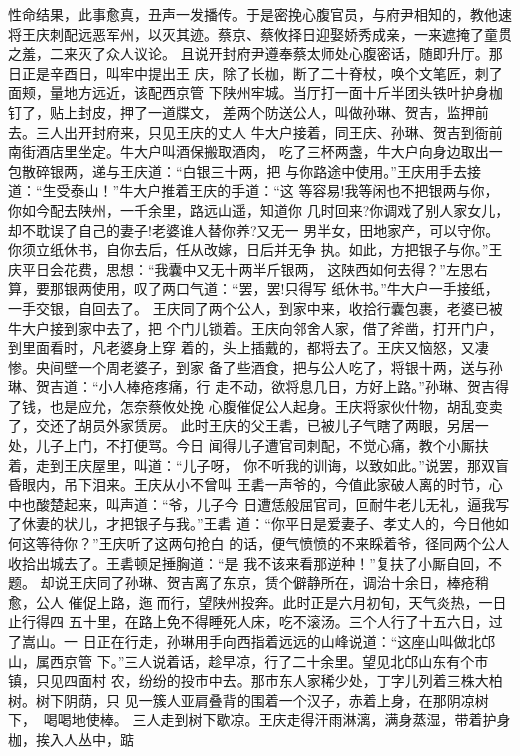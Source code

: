 性命结果，此事愈真，丑声一发播传。于是密挽心腹官员，与府尹相知的，教他速
将王庆刺配远恶军州，以灭其迹。蔡京、蔡攸择日迎娶娇秀成亲，一来遮掩了童贯
之羞，二来灭了众人议论。
且说开封府尹遵奉蔡太师处心腹密话，随即升厅。那日正是辛酉日，叫牢中提出王
庆，除了长枷，断了二十脊杖，唤个文笔匠，刺了面颊，量地方远近，该配西京管
下陕州牢城。当厅打一面十斤半团头铁叶护身枷钉了，贴上封皮，押了一道牒文，
差两个防送公人，叫做孙琳、贺吉，监押前去。三人出开封府来，只见王庆的丈人
牛大户接着，同王庆、孙琳、贺吉到衙前南街酒店里坐定。牛大户叫酒保搬取酒肉，
吃了三杯两盏，牛大户向身边取出一包散碎银两，递与王庆道：“白银三十两，把
与你路途中使用。”王庆用手去接道：“生受泰山！”牛大户推着王庆的手道：“这
等容易!我等闲也不把银两与你，你如今配去陕州，一千余里，路远山遥，知道你
几时回来?你调戏了别人家女儿，却不耽误了自己的妻子!老婆谁人替你养?又无一
男半女，田地家产，可以守你。你须立纸休书，自你去后，任从改嫁，日后并无争
执。如此，方把银子与你。”王庆平日会花费，思想：“我囊中又无十两半斤银两，
这陕西如何去得？”左思右算，要那银两使用，叹了两口气道：“罢，罢!只得写
纸休书。”牛大户一手接纸，一手交银，自回去了。
王庆同了两个公人，到家中来，收拾行囊包裹，老婆已被牛大户接到家中去了，把
个门儿锁着。王庆向邻舍人家，借了斧凿，打开门户，到里面看时，凡老婆身上穿
着的，头上插戴的，都将去了。王庆又恼怒，又凄惨。央间壁一个周老婆子，到家
备了些酒食，把与公人吃了，将银十两，送与孙琳、贺吉道：“小人棒疮疼痛，行
走不动，欲将息几日，方好上路。”孙琳、贺吉得了钱，也是应允，怎奈蔡攸处挽
心腹催促公人起身。王庆将家伙什物，胡乱变卖了，交还了胡员外家赁房。
此时王庆的父王砉，已被儿子气瞎了两眼，另居一处，儿子上门，不打便骂。今日
闻得儿子遭官司刺配，不觉心痛，教个小厮扶着，走到王庆屋里，叫道：“儿子呀，
你不听我的训诲，以致如此。”说罢，那双盲昏眼内，吊下泪来。王庆从小不曾叫
王砉一声爷的，今值此家破人离的时节，心中也酸楚起来，叫声道：“爷，儿子今
日遭恁般屈官司，叵耐牛老儿无礼，逼我写了休妻的状儿，才把银子与我。”王砉
道：“你平日是爱妻子、孝丈人的，今日他如何这等待你？”王庆听了这两句抢白
的话，便气愤愤的不来睬着爷，径同两个公人收拾出城去了。王砉顿足捶胸道：“是
我不该来看那逆种！”复扶了小厮自回，不题。
却说王庆同了孙琳、贺吉离了东京，赁个僻静所在，调治十余日，棒疮稍愈，公人
催促上路，迤而行，望陕州投奔。此时正是六月初旬，天气炎热，一日止行得四
五十里，在路上免不得睡死人床，吃不滚汤。三个人行了十五六日，过了嵩山。一
日正在行走，孙琳用手向西指着远远的山峰说道：“这座山叫做北邙山，属西京管
下。”三人说着话，趁早凉，行了二十余里。望见北邙山东有个市镇，只见四面村
农，纷纷的投市中去。那市东人家稀少处，丁字儿列着三株大柏树。树下阴荫，只
见一簇人亚肩叠背的围着一个汉子，赤着上身，在那阴凉树下，喝喝地使棒。
三人走到树下歇凉。王庆走得汗雨淋漓，满身蒸湿，带着护身枷，挨入人丛中，踮
